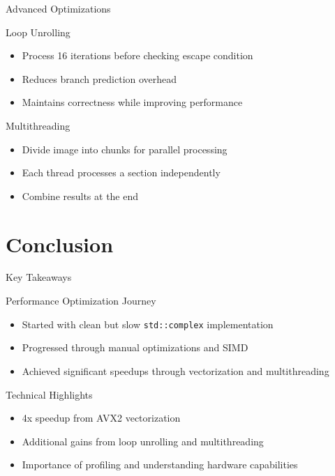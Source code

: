 \documentclass{beamer}
\begin{document}
\begin{frame}{Advanced Optimizations}
    \begin{block}{Loop Unrolling}
        \begin{itemize}
            \item Process 16 iterations before checking escape condition
            \item Reduces branch prediction overhead
            \item Maintains correctness while improving performance
        \end{itemize}
    \end{block}
    \begin{block}{Multithreading}
        \begin{itemize}
            \item Divide image into chunks for parallel processing
            \item Each thread processes a section independently
            \item Combine results at the end
        \end{itemize}
    \end{block}
\end{frame}

\section{Conclusion}
\begin{frame}{Key Takeaways}
    \begin{block}{Performance Optimization Journey}
        \begin{itemize}
            \item Started with clean but slow \texttt{std::complex} implementation
            \item Progressed through manual optimizations and SIMD
            \item Achieved significant speedups through vectorization and multithreading
        \end{itemize}
    \end{block}
    \begin{block}{Technical Highlights}
        \begin{itemize}
            \item 4x speedup from AVX2 vectorization
            \item Additional gains from loop unrolling and multithreading
            \item Importance of profiling and understanding hardware capabilities
        \end{itemize}
    \end{block}
\end{frame}
\end{document}
